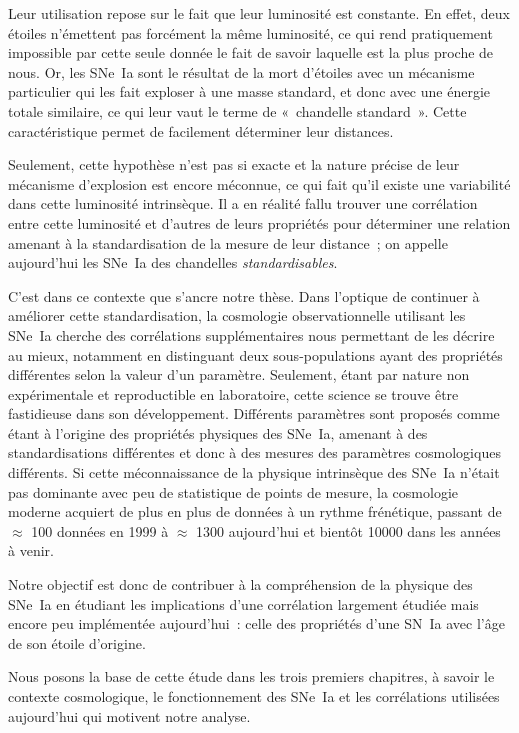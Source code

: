 \documentclass[../main/main.tex]{subfiles}
\begin{document}
Leur utilisation repose sur le fait que leur luminosité est constante. En effet,
deux étoiles n'émettent pas forcément la même luminosité, ce qui rend
pratiquement impossible par cette seule donnée le fait de savoir laquelle est la
plus proche de nous. Or, les SNe~Ia sont le résultat de la mort d'étoiles
avec un mécanisme particulier qui les fait exploser à une masse standard, et
donc avec une énergie totale similaire, ce qui leur vaut le terme de «~chandelle
standard~». Cette caractéristique permet de facilement déterminer leur
distances.

Seulement, cette hypothèse n'est pas si exacte et la nature précise de leur
mécanisme d'explosion est encore méconnue, ce qui fait qu'il existe une
variabilité dans cette luminosité intrinsèque. Il a en réalité fallu trouver une
corrélation entre cette luminosité et d'autres de leurs propriétés pour
déterminer une relation amenant à la standardisation de la mesure de leur
distance~; on appelle aujourd'hui les SNe~Ia des chandelles
\textit{standardisables}.

C'est dans ce contexte que s'ancre notre thèse. Dans l'optique de continuer à
améliorer cette standardisation, la cosmologie observationnelle utilisant les
SNe~Ia cherche des corrélations supplémentaires nous permettant de les décrire
au mieux, notamment en distinguant deux sous-populations ayant des propriétés
différentes selon la valeur d'un paramètre. Seulement, étant par nature
non expérimentale et reproductible en laboratoire, cette science se trouve être
fastidieuse dans son développement. Différents paramètres sont proposés comme
étant à l'origine des propriétés physiques des SNe~Ia, amenant à des
standardisations différentes et donc à des mesures des paramètres cosmologiques
différents. Si cette méconnaissance de la physique intrinsèque des SNe~Ia
n'était pas dominante avec peu de statistique de points de mesure, la cosmologie
moderne acquiert de plus en plus de données à un rythme frénétique, passant de
$\approx$ 100 données en 1999 à $\approx$ \num{1300} aujourd'hui et bientôt
\num{10000} dans les années à venir.

Notre objectif est donc de contribuer à la compréhension de la physique des
SNe~Ia en étudiant les implications d'une corrélation largement étudiée mais
encore peu implémentée aujourd'hui~: celle des propriétés d'une SN~Ia avec l'âge
de son étoile d'origine.

Nous posons la base de cette étude dans les trois premiers chapitres, à savoir
le contexte cosmologique, le fonctionnement des SNe~Ia et les corrélations
utilisées aujourd'hui qui motivent notre analyse.
\end{document}
